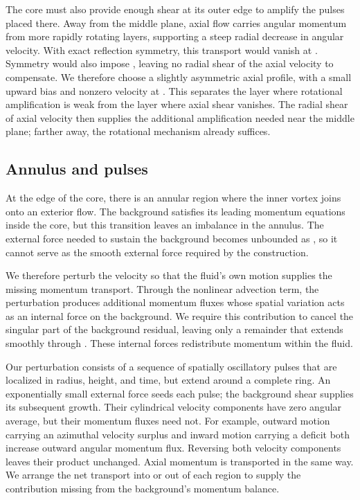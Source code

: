 The core must also provide enough shear at its outer edge to amplify the pulses placed
there. Away from the middle plane, axial flow carries angular momentum from more rapidly
rotating layers, supporting a steep radial decrease in angular velocity. With exact reflection
symmetry, this transport would vanish at . Symmetry would also impose
,
leaving no radial shear of the axial velocity to compensate. We therefore choose a slightly
asymmetric axial profile, with a small upward bias and nonzero velocity at
. This
separates the layer where rotational amplification is weak from the layer where axial shear
vanishes. The radial shear of axial velocity then supplies the additional amplification needed
near the middle plane; farther away, the rotational mechanism already suffices.

\subsection{Annulus and pulses}\label{sec:2.2}
At the edge of the core, there is an annular region where the inner
vortex joins onto an exterior flow. The background satisfies its leading momentum equations
inside the core, but this transition leaves an imbalance in the annulus. The external force
needed to sustain the background becomes unbounded as , so it cannot serve as the
smooth external force required by the construction.

We therefore perturb the velocity so that the fluid's own motion supplies the missing
momentum transport. Through the nonlinear advection term, the perturbation produces
additional momentum fluxes whose spatial variation acts as an internal force on the background.
We require this contribution to cancel the singular part of the background residual,
leaving only a remainder that extends smoothly through . These internal forces
redistribute momentum within the fluid.

%
Our perturbation consists of a sequence of spatially oscillatory pulses that are localized
in radius, height, and time, but extend around a complete ring. An exponentially small
external force seeds each pulse; the background shear supplies its subsequent growth. Their
cylindrical velocity components have zero angular average, but their momentum fluxes
need not. For example, outward motion carrying an azimuthal velocity surplus and inward
motion carrying a deficit both increase outward angular momentum flux. Reversing both
velocity components leaves their product unchanged. Axial momentum is transported in the
same way. We arrange the net transport into or out of each region to supply the contribution
missing from the background's momentum balance.

